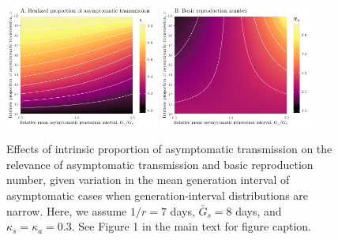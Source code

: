 \begin{figure}[!ht]
\begin{center}
\includegraphics[width=0.45\textwidth]{figheatmap_03.pdf}
\mbox{\hspace{0.05\textwidth}}
\includegraphics[width=0.45\textwidth]{figheatmap_R0_03.pdf}
\caption{Effects of intrinsic proportion of asymptomatic transmission on the relevance of asymptomatic transmission and basic reproduction number, given variation in
the mean generation interval of asymptomatic cases when generation-interval distributions are narrow. 
Here, we assume $1/r=7$ days, $\bar G_s=8$ days, and $\kappa_s=\kappa_a=0.3$.
See Figure 1 in the main text for figure caption.
}
\end{center}
\end{figure}

\pagebreak

